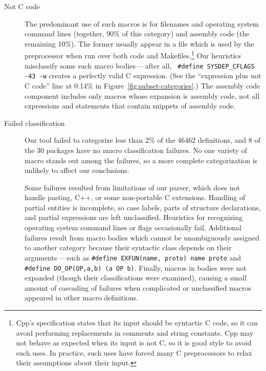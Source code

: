 \documentclass[10pt]{article}
\def\numpackages{30}
\begin{document}
\begin{description}
\item[Not C code]\label{page:not-c-code}
  The predominant use of such macros is for filenames and operating system
  command lines (together, 90\% of this category) and assembly code (the
  remaining 10\%).  The former usually appear in a file which is used by
  the preprocessor when run over both code and Makefiles.\footnote{Cpp's
    specification states that its input should be syntactic C code, so it
    can avoid performing replacements in comments and string constants.
    Cpp may not behave as expected when its input is not C, so it is good
    style to avoid such uses.  In practice, such uses have forced many C
    preprocessors to relax their assumptions about their input.}  Our
  heuristics misclassify some such macro bodies\,---\,after all, {\tt
  \#define \verb|SYSDEP_CFLAGS| -43 -w} creates a perfectly valid C
expression.  (See the ``expression plus not C code'' line at 0.14\% in
Figure~\ref{fig:subset-categories}.)  The assembly code component includes
only macros whose expansion is assembly code, not all expressions and
statements that contain snippets of assembly code.

\item[Failed classification]
  Our tool failed to categorize less than 2\% of the 46462 definitions, and
  8 of the {\numpackages} packages have no macro classification failures.
  No one variety of macro stands out among the failures, so a more complete
  categorization is unlikely to affect our conclusions.
  
  Some failures resulted from limitations of our parser, which does not
  handle pasting, C++, or some
  non-portable C extensions.  Handling of partial entities is incomplete,
  so case labels, parts of structure declarations, and partial expressions
  are left unclassified.  Heuristics for recognizing operating system
  command lines or flags occasionally fail.  Additional failures result
  from macro bodies which cannot be unambiguously assigned to another
  category because their syntactic class depends on their
  arguments\,---\,such as {\tt \#define EXFUN(name, proto) name proto} and
  {\tt \#define
\verb|DO_OP|(OP,a,b) (a OP b)}.  Finally, macros in bodies were not
expanded (though their classifications were examined), causing a small
amount of cascading of failures when complicated or unclassified macros
appeared in other macro definitions.

\end{description}
\end{document}
